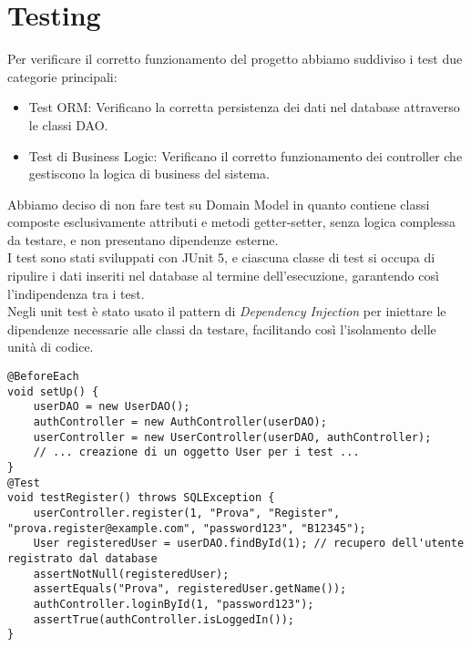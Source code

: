 \section{Testing}

Per verificare il corretto funzionamento del progetto abbiamo suddiviso i test due categorie principali:
\begin{itemize}
    \item Test ORM: Verificano la corretta persistenza dei dati nel database attraverso le classi DAO.
    \item Test di Business Logic: Verificano il corretto funzionamento dei controller che gestiscono la logica di business del sistema.
\end{itemize}
Abbiamo deciso di non fare test su Domain Model in quanto contiene classi composte esclusivamente attributi e metodi getter-setter, senza logica complessa da testare, e non presentano dipendenze esterne.\\
I test sono stati sviluppati con JUnit 5, e ciascuna classe di test si occupa di ripulire i dati inseriti nel database al termine dell'esecuzione, garantendo così l'indipendenza tra i test.\\
Negli unit test è stato usato il pattern di \textit{Dependency Injection} per iniettare le dipendenze necessarie alle classi da testare, facilitando così l'isolamento delle unità di codice.\\
\begin{lstlisting}[style=java, caption={Esempio di Dependency Injection in UserControllerTest}]
@BeforeEach
void setUp() {
    userDAO = new UserDAO();
    authController = new AuthController(userDAO);
    userController = new UserController(userDAO, authController);
    // ... creazione di un oggetto User per i test ...
}
@Test
void testRegister() throws SQLException {
    userController.register(1, "Prova", "Register", "prova.register@example.com", "password123", "B12345");
    User registeredUser = userDAO.findById(1); // recupero dell'utente registrato dal database
    assertNotNull(registeredUser);
    assertEquals("Prova", registeredUser.getName());
    authController.loginById(1, "password123");
    assertTrue(authController.isLoggedIn());
}
\end{lstlisting}
